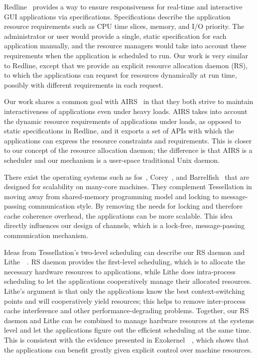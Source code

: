 \documentclass[letterpaper,twocolumn,11pt]{article}
\begin{document}
Redline~\cite{DBLP:conf/osdi/YangLBKM08} provides a way to ensure responsiveness for real-time and interactive GUI applications via specifications. Specifications describe the application resource requirements such as CPU time slices, memory, and I/O priority. The administrator or user would provide a single, static specification for each application manually, and the resource managers would take into account these requirements when the application is scheduled to run. Our work is very similar to Redline, except that we provide an explicit resource allocation daemon (RS), to which the applications can request for resources dynamically at run time, possibly with different requirements in each request.

Our work shares a common goal with AIRS~\cite{kato:airs:} in that they both strive to maintain interactiveness of applications even under heavy loads. AIRS takes into account the dynamic resource requirements of applications under loads, as opposed to static specifications in Redline, and it exports a set of APIs with which the applications can express the resource constraints and requirements. This is closer to our concept of the resource allocation daemon; the difference is that AIRS is a scheduler and our mechanism is a user-space traditional Unix daemon.

There exist the operating systems such as fos~\cite{Wentzlaff:2009:FOS:1531793.1531805}, Corey~\cite{Boyd-Wickizer:2008:COS:1855741.1855745}, and Barrelfish~\cite{Schüpbach08embracingdiversity} that are designed for scalability on many-core machines. They complement Tessellation in moving away from shared-memory programming model and locking to message-passing communication style. By removing the needs for locking and therefore cache coherence overhead, the applications can be more scalable. This idea directly influences our design of channels, which is a lock-free, message-passing communication mechanism.

Ideas from Tessellation's two-level scheduling can describe our RS daemon and Lithe~\cite{Pan:2010:CPS:1809028.1806639}~\cite{Pan:2010:CPS:1806596.1806639}. RS daemon provides the first-level scheduling, which is to allocate the necessary hardware resources to applications, while Lithe does intra-process scheduling to let the applications cooperatively manage their allocated resources. Lithe's argument is that only the applications know the best context-switching points and will cooperatively yield resources; this helps to remove inter-process cache interference and other performance-degrading problems. Together, our RS daemon and Lithe can be combined to manage hardware resources at the systems level and let the applications figure out the efficient scheduling at the same time. This is consistent with the evidence presented in Exokernel~\cite{Engler:1995:EOS:224056.224076}~\cite{Engler:1995:EOS:224057.224076}, which shows that the applications can benefit greatly given explicit control over machine resources.
\end{document}
